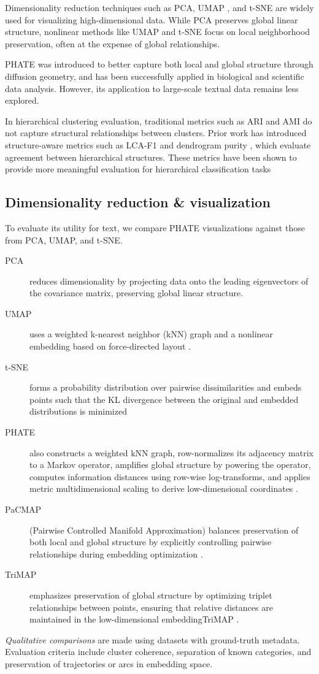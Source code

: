Dimensionality reduction techniques such as PCA, UMAP \cite{mcinnes2018umap}, and t-SNE \cite{van2008visualizing} are widely used for visualizing high-dimensional data. While PCA preserves global linear structure, nonlinear methods like UMAP and t-SNE focus on local neighborhood preservation, often at the expense of global relationships.

PHATE \cite{moon2019visualizing} was introduced to better capture both local and global structure through diffusion geometry, and has been successfully applied in biological and scientific data analysis. However, its application to large-scale textual data remains less explored.

In hierarchical clustering evaluation, traditional metrics such as ARI and AMI do not capture structural relationships between clusters. Prior work has introduced structure-aware metrics such as LCA-F1 \cite{kosmopoulos2015} and dendrogram purity \cite{heller2005bayesian}, which evaluate agreement between hierarchical structures. These metrics have been shown to provide more meaningful evaluation for hierarchical classification tasks \cite{kosmopoulos2015}

\subsection{Dimensionality reduction \& visualization}
To evaluate its utility for text, we compare PHATE visualizations against those from PCA, UMAP, and t-SNE.
\begin{description}
    \item[PCA] reduces dimensionality by projecting data onto the leading eigenvectors of the covariance matrix, preserving global linear structure.
    \item[UMAP] uses a weighted k-nearest neighbor (kNN) graph and a nonlinear embedding based on force-directed layout \cite{mcinnes2018umap}.
    \item[t-SNE] forms a probability distribution over pairwise dissimilarities and embeds points such that the KL divergence between the original and embedded distributions is minimized \cite{van2008visualizing}
    \item[PHATE] also constructs a weighted kNN graph, row-normalizes its adjacency matrix to a Markov operator, amplifies global structure by powering the operator, computes information distances using row-wise log-transforms, and applies metric multidimensional scaling to derive low-dimensional coordinates \cite{moon2019visualizing}.
    \item[PaCMAP] (Pairwise Controlled Manifold Approximation) balances preservation of both local and global structure by explicitly controlling pairwise relationships during embedding optimization \cite{wang2021pacmap}.
    \item[TriMAP] emphasizes preservation of global structure by optimizing triplet relationships between points, ensuring that relative distances are maintained in the low-dimensional embeddingTriMAP \cite{trimap}.
\end{description}
\textit{Qualitative comparisons} are made using datasets with ground-truth metadata. Evaluation criteria include cluster coherence, separation of known categories, and preservation of trajectories or arcs in embedding space.

